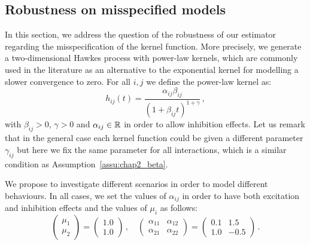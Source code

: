 \subsection{Robustness on misspecified models}
In this section, we address the question of the robustness of our estimator regarding the misspecification of the kernel function. More precisely, we generate a two-dimensional Hawkes process with power-law kernels, which are commonly used in the literature \parencite{Mishra2016, Ogata1988} as an alternative to the exponential kernel for modelling a slower convergence to zero. For all $i, j$ we define the power-law kernel as: \[h_{ij}(t) = \frac{\alpha_{ij}\beta_{ij}}{(1 + \beta_{ij}t)^{1 + \gamma}}\,,\] with $\beta_{ij} > 0$, $\gamma > 0$ and $\alpha_{ij}\in{\mathbb R}$ in order to allow inhibition effects. Let us remark that in the general case each kernel function could be given a different parameter $\gamma_{ij}$ but here we fix the same parameter for all interactions, which is a similar condition as Assumption~\ref{assu:chap2_beta}.

We propose to investigate different scenarios in order to model different behaviours. In all cases, we set the values of $\alpha_{ij}$ in order to have both excitation and inhibition effects and the values of $\mu_i$ as follows:
\[
 \begin{pmatrix}
  \mu_{1} \\
  \mu_{2} 
  \end{pmatrix} =
  \begin{pmatrix}
  1.0 \\ 
  1.0
  \end{pmatrix}\,,
  \quad
  \begin{pmatrix}
  \alpha_{11} & \alpha_{12}\\
  \alpha_{21} & \alpha_{22}
  \end{pmatrix}=
  \begin{pmatrix}
  0.1 & 1.5\\
  1.0 & -0.5
  \end{pmatrix}\,.
\]

